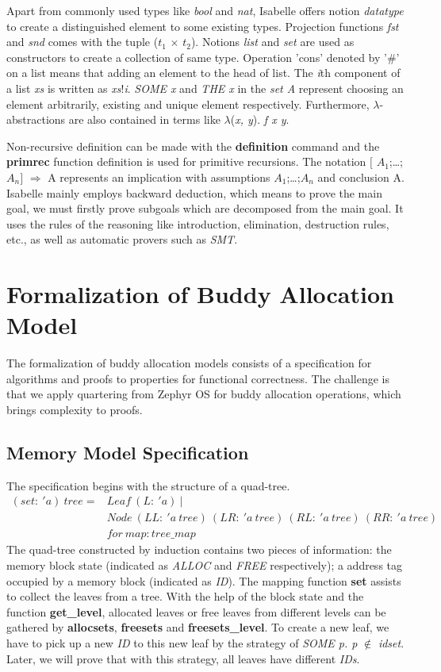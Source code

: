 \documentclass[runningheads]{llncs}
\begin{document}
Apart from commonly used types like \textsl{bool} and \textsl{nat}, Isabelle offers notion \textsl{datatype} to create a distinguished element to some existing types. Projection functions \textsl{fst} and \textsl{snd} comes with the tuple (\textsl{$t_1$} $\times$ \textsl{$t_2$}). Notions \textsl{list} and \textsl{set} are used as constructors to create a collection of same type. Operation 'cons' denoted by '$\#$' on a list means that adding an element to the head of list. The \textsl{i}th component of a list \textsl{xs} is written as \textsl{xs}!\textsl{i}. \textsl{SOME x} and \textsl{THE x} in the \textsl{set A} represent choosing an element arbitrarily, existing and unique element respectively. Furthermore, $\lambda$-abstractions are also contained in terms like $\lambda$(\textsl{x, y}). \textsl{f x y}.

Non-recursive definition can be made with the \textbf{definition} command and the \textbf{primrec} function definition is used for primitive recursions. The notation $\lbrack$ $A_1$;\dots;$A_n$$\rbrack$ $\Longrightarrow$ A represents an implication with assumptions $A_1$;\dots;$A_n$ and conclusion A. Isabelle mainly employs backward deduction, which means to prove the main goal, we must firstly prove subgoals which are decomposed from the main goal. It uses the rules of the reasoning like introduction, elimination, destruction rules, etc., as well as automatic provers such as \textsl{SMT}.


\section{Formalization of Buddy Allocation Model}
The formalization of buddy allocation models consists of a specification for algorithms and proofs to properties for functional correctness. The challenge is that we apply quartering from Zephyr OS for buddy allocation operations, which brings complexity to proofs.

\subsection{Memory Model Specification}
The specification begins with the structure of a quad-tree.
\begin{align*}
(set:\ 'a)\ tree = &Leaf\ (L:\ 'a)\ | \\
&Node\ (LL:\ 'a\ tree)\ (LR:\ 'a\ tree)\ (RL:\ 'a\ tree)\ (RR:\ 'a\ tree) \\
&for\ map: tree\_map
\end{align*}
The quad-tree constructed by induction contains two pieces of information: the memory block state (indicated as \textsl{ALLOC} and \textsl{FREE} respectively); a address tag occupied by a memory block (indicated as \textsl{ID}). The mapping function \textbf{set} assists to collect the leaves from a tree. With the help of the block state and the function \textbf{get\_level}, allocated leaves or free leaves from different levels can be gathered by \textbf{allocsets}, \textbf{freesets} and \textbf{freesets\_level}. To create a new leaf, we have to pick up a new \textsl{ID} to this new leaf by the strategy of \textsl{SOME p. p} $\notin$ \textsl{idset}. Later, we will prove that with this strategy, all leaves have different \textsl{IDs}.
\end{document}
